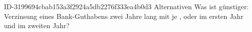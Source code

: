 \begin{exercise}
      {ID-3199694cbab153a3f2924a5db2276f333ea4b0d3}
      {Alternativen}
  \ifproblem\problem
    Was ist günstiger: Verzinsung eines Bank-Guthabens zwei Jahre lang mit
    je , oder  im ersten Jahr und  im zweiten Jahr?
  \fi
\end{exercise}
